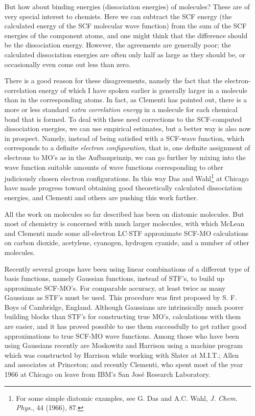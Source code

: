 \documentclass[11pt]{memoir}
\begin{document}
But how about binding energies (dissociation energies) of molecules?  These are of very special interest to chemists.  Here we can subtract the SCF energy (the calculated energy of the SCF molecular wave function) from the sum of the SCF energies of the component atoms, and one might think that the difference should be the dissociation energy.  However, the agreements are generally poor; the calculated dissociation energies are often only half as large as they should be, or occasionally even come out less than zero.

There is a good reason for these disagreements, namely the fact that the electron-correlation energy of which I have spoken earlier is generally larger in a molecule than in the corresponding atoms.  In fact, as Clementi has pointed out, there is a more or less standard \emph{extra correlation energy} in a molecule for each chemical bond that is formed.  To deal with these need corrections to the SCF-computed dissociation energies, we can use empirical estimates, but a better way is also now in prospect.  Namely, instead of being satisfied with a SCF-wave function, which corresponds to a definite \emph{electron configuration}, that is, one definite assignment of electrons to MO's as in the Aufbauprinzip, we can go further by mixing into the wave function suitable amounts of wave functions corresponding to other judiciously chosen electron configurations.  In this way Das and Wahl\footnote{For some simple diatomic examples, see G. Das and A.C. Wahl, \emph{J. Chem. Phys.}, 44 (1966), 87.} at Chicago have made progress toward obtaining good theoretically calculated dissociation energies, and Clementi and others are pushing this work farther.

All the work on molecules so far described has been on diatomic molecules.  But most of chemistry is concerned with much larger molecules, with which McLean and Clementi made some all-electron LC$\cdot$STF approximate SCF-MO calculations on carbon dioxide, acetylene, cyanogen, hydrogen cyanide, and a number of other molecules.

Recently several groups have been using linear combinations of a different type of basis functions, namely Gaussian functions, instead of STF's, to build up approximate SCF-MO's.  For comparable accuracy, at least twice as many Gaussians as STF's must be used.  This procedure was first proposed by S. F. Boys of Cambridge, England.  Although Gaussians are intrinsically much poorer building blocks than STF's for constructing true MO's, calculations with them are easier, and it has proved possible to use them successfully to get rather good approximations to true SCF-MO wave functions.  Among those who have been using Gaussians recently are Moskowitz and Harrison using a machine program which was constructed by Harrison while working with Slater at M.I.T.; Allen and associates at Princeton; and recently Clementi, who spent most of the year 1966 at Chicago on leave from IBM's San Jos\'{e} Research Laboratory. 
\end{document}
